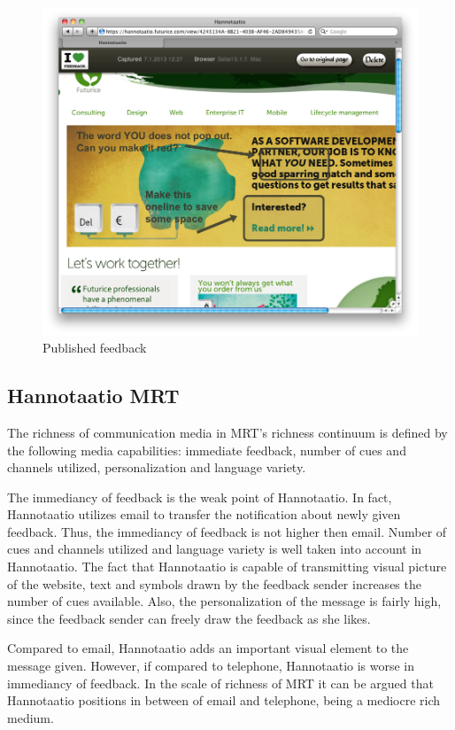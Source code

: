 \documentclass[english,12pt,a4paper,pdftex]{article}
\begin{document}
\begin{figure}[htb]
\begin{center}
\includegraphics[width=1.0\textwidth]{published_feedback.png}
\end{center}
\caption{Published feedback}
\end{figure}

\subsection{Hannotaatio MRT}

The richness of communication media in \ac{MRT}'s richness continuum is defined by the following media capabilities: immediate feedback, number of cues and channels utilized, personalization and language variety.

The immediancy of feedback is the weak point of Hannotaatio. In fact, Hannotaatio utilizes email to transfer the notification about newly given feedback. Thus, the immediancy of feedback is not higher then email. Number of cues and channels utilized and language variety is well taken into account in Hannotaatio. The fact that Hannotaatio is capable of transmitting visual picture of the website, text and symbols drawn by the feedback sender increases the number of cues available. Also, the personalization of the message is fairly high, since the feedback sender can freely draw the feedback as she likes.

Compared to email, Hannotaatio adds an important visual element to the message given. However, if compared to telephone, Hannotaatio is worse in immediancy of feedback. In the scale of richness of \ac{MRT} it can be argued that Hannotaatio positions in between of email and telephone, being a mediocre rich medium.
\end{document}
